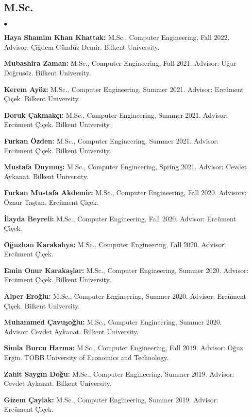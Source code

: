 \documentclass[margin,line]{res}
\newenvironment{list2}{
  \begin{list}{$\bullet$}{%
      \setlength{\itemsep}{0.1cm}
      \setlength{\parsep}{0in} \setlength{\parskip}{0in}
      \setlength{\topsep}{0in} \setlength{\partopsep}{0in} 
      \setlength{\leftmargin}{0.2in}}}{\end{list}}
\begin{document}
\begin{resume}
\subsection{\small \sc M.Sc.}
\begin{list2}
\item
{\bf Haya Shamim Khan Khattak:} M.Sc., Computer Engineering, Fall 2022.
  Advisor: Çiğdem Gündüz Demir.
  Bilkent University.
\item
{\bf Mubashira Zaman:} M.Sc., Computer Engineering, Fall 2021.
  Advisor: Uğur Doğrusöz.
  Bilkent University.
\item
{\bf  Kerem Ayöz:} M.Sc., Computer Engineering, Summer 2021.
  Advisor: Ercüment Çiçek.
  Bilkent University.
\item
{\bf  Doruk Çakmakçı:} M.Sc., Computer Engineering, Summer 2021.
  Advisor: Ercüment Çiçek.
  Bilkent University.
\item
{\bf  Furkan Özden:} M.Sc., Computer Engineering, Summer 2021.
  Advisor: Ercüment Çiçek.
  Bilkent University.
\item
{\bf  Mustafa Duymuş:} M.Sc., Computer Engineering, Spring 2021.
  Advisor: Cevdet Aykanat.
  Bilkent University.
\item 
{\bf Furkan Mustafa Akdemir:} M.Sc., Computer Engineering, Fall 2020.
  Advisors:  Öznur Taştan, Ercüment Çiçek.
\item 
{\bf İlayda Beyreli:} M.Sc., Computer Engineering, Fall 2020.
  Advisor:  Ercüment Çiçek.
\item 
{\bf Oğuzhan Karakahya:} M.Sc., Computer Engineering, Fall 2020.
  Advisor:  Ercüment Çiçek.
\item 
{\bf  Emin Onur Karakaşlar:} M.Sc., Computer Engineering, Summer 2020.
  Advisor:  Ercüment Çiçek.
  Bilkent University.\item 
{\bf  Alper Eroğlu:} M.Sc., Computer Engineering, Summer 2020.
  Advisor:  Ercüment Çiçek.
  Bilkent University.
  \item
{\bf  Muhammed Çavuşoğlu:} M.Sc., Computer Engineering, Summer 2020.
  Advisor: Cevdet Aykanat.
  Bilkent University.
\item
{\bf  Simla Burcu Harma:} M.Sc., Computer Engineering, Fall 2019.
  Advisor: Oğuz Ergin.
  TOBB University of Economics and Technology.
\item
{\bf  Zahit Saygın Doğu:} M.Sc., Computer Engineering, Summer 2019.
  Advisor: Cevdet Aykanat.
  Bilkent University.
  \item
{\bf  Gizem Çaylak:} M.Sc., Computer Engineering, Summer 2019.
  Advisor: Ercüment Çiçek.

\end{list2}
\end{resume}
\end{document}
